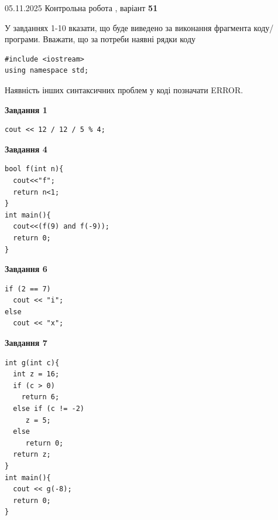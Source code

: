 \documentclass[12pt, ukrainian]{article}
\begin{document}
{\Large{05.11.2025 Контрольна робота , варіант  \No \textbf { 51 }\par}}
{
\begin {large}
У завданнях 1-10 вказати, що буде виведено за виконання фрагмента коду/про\-гра\-ми.
Вважати, що за потреби наявні рядки коду
\begin{verbatim}
#include <iostream>
using namespace std;
\end{verbatim}
Наявність інших синтаксичних проблем у коді позначати ERROR.

\begin{minipage}[t]{7.0cm}

\begin{center}
\textbf{Завдання 1}
\end{center}
\vspace{-8mm}

\begin{verbatim}
cout << 12 / 12 / 5 % 4;
\end{verbatim}



\begin{center}
\textbf{Завдання 4}
\end{center}
\vspace{-8mm}

\begin{verbatim}
bool f(int n){
  cout<<"f";
  return n<1;
}
int main(){
  cout<<(f(9) and f(-9));
  return 0;
}
\end{verbatim}



\begin{center}
\textbf{Завдання 6}
\end{center}
\vspace{-8mm}

\begin{verbatim}
if (2 == 7)
  cout << "i";
else
  cout << "x";
\end{verbatim}



\begin{center}
\textbf{Завдання 7}
\end{center}
\vspace{-8mm}

\begin{verbatim}
int g(int c){
  int z = 16;
  if (c > 0)
    return 6;
  else if (c != -2)
     z = 5;
  else
     return 0;
  return z;
}
int main(){
  cout << g(-8);
  return 0;
}
\end{verbatim}


\end{minipage}
\end{large}}
\end{document}
